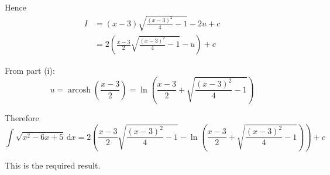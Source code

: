 \documentclass[leqno]{article}
\begin{document}
\begin{enumerate}[
  label=\textbf{\arabic*.},
  leftmargin=*,
  topsep=0pt,
  partopsep=0pt,
  parsep=0pt
]
\begin{djsSolution}
\begin{enumerate}[label=\textbf{(\roman*)}, start=1]
  Hence
  \begin{align*}
  I
  &=(x-3)\sqrt{\frac{(x-3)^2}{4}-1}-2u+c \\
  &=2\left(\frac{x-3}{2}\sqrt{\frac{(x-3)^2}{4}-1}-u\right)+c
  \end{align*}

  From part (i):
  \[
  u=\operatorname{arcosh}\left(\frac{x-3}{2}\right)
  =\ln\left(\frac{x-3}{2}+\sqrt{\frac{(x-3)^2}{4}-1}\right)
  \]

  Therefore
  \[
  \int \sqrt{x^2-6x+5}\,\mathrm{d}x
  =2\left(\frac{x-3}{2}\sqrt{\frac{(x-3)^2}{4}-1}-\ln\left(\frac{x-3}{2}+\sqrt{\frac{(x-3)^2}{4}-1}\right)\right)+c
  \]

  This is the required result.
\end{enumerate}
\end{djsSolution}


\end{enumerate}
\end{document}
